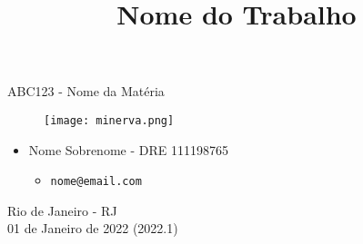\title{Nome do Trabalho}

\begin{titlepage}
    \begin{center}
        \LARGE
        ABC123 - Nome da Matéria

        \vspace{1.5cm}

        \Huge
        \thetitle

        \vspace{1.5cm}

        \Huge
        \begin{figure}[h]
            \centering
            \texttt{[image: minerva.png]}
        \end{figure}

        \vspace{2.5cm}

        \large
        \begin{itemize}
            \item Nome Sobrenome - DRE 111198765
            \begin{itemize}
                \item \texttt{nome@email.com}
            \end{itemize}
        \end{itemize}

        \vspace{1.5cm}


        \vspace{0.5cm}
        \vfill
        \vspace{1.0cm}
        
        \large
        Rio de Janeiro - RJ\\
        01 de Janeiro de 2022 (2022.1)

    \end{center}
\end{titlepage}